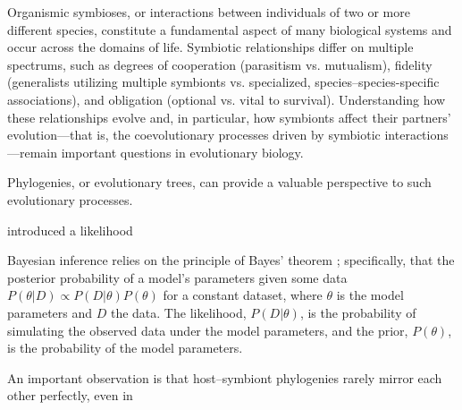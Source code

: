 \documentclass[12pt,letterpaper]{article}
\begin{document}
Organismic symbioses, or interactions between individuals of two or more different species, constitute a fundamental aspect of many biological systems and occur across the domains of life. Symbiotic relationships differ on multiple spectrums, such as degrees of cooperation (parasitism vs. mutualism), fidelity (generalists utilizing multiple symbionts vs. specialized, species--species-specific associations), and obligation (optional vs. vital to survival). Understanding how these relationships evolve and, in particular, how symbionts affect their partners' evolution---that is, the coevolutionary processes driven by symbiotic interactions---remain important questions in evolutionary biology.

Phylogenies, or evolutionary trees, can provide a valuable perspective to such evolutionary processes. 

\textcite{Felsenstein:1981} introduced a likelihood

Bayesian inference relies on the principle of Bayes' theorem \parencite{Bayes:1763}; specifically, that the posterior probability of a model's parameters given some data $P\left(\theta|D\right) \propto P\left(D|\theta\right) P\left(\theta\right)$ for a constant dataset, where $\theta$ is the model parameters and $D$ the data. The likelihood, $P\left(D|\theta\right)$, is the probability of simulating the observed data under the model parameters, and the prior, $P\left(\theta\right)$, is the probability of the model parameters. 

An important observation is that host--symbiont phylogenies rarely mirror each other perfectly, even in 
\end{document}
